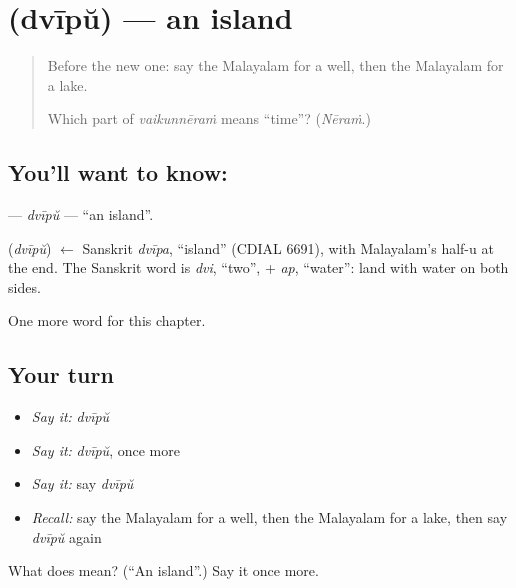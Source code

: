 \section[\texorpdfstring{\ml{ദ്വീപ്} (dvīpŭ)}{ദ്വീപ് (dvīpŭ)}]{ (dvīpŭ) — an island}

\label{lesson:ML-C148-dvipu}



\begin{quote}
Before the new one: say the Malayalam for a well, then the Malayalam for a lake.

Which part of \emph{vaikunnēraṁ} means \textquotedblleft{}time\textquotedblright{}? (\emph{Nēraṁ}.)
\end{quote}

\subsection*{You'll want to know: }
\textbf{} — \emph{dvīpŭ} — \textquotedblleft{}an island\textquotedblright{}.

\begin{cousinweb}
\textbf{} (\emph{dvīpŭ}) $\leftarrow$ Sanskrit \emph{dvīpa}, \textquotedblleft{}island\textquotedblright{} (CDIAL 6691), with Malayalam's half-u at the end. The Sanskrit word is \emph{dvi}, \textquotedblleft{}two\textquotedblright{}, + \emph{ap}, \textquotedblleft{}water\textquotedblright{}: land with water on both sides.
\end{cousinweb}

\begin{grammarlens}[title={What you've built}]
One more word for this chapter.
\end{grammarlens}

\subsection*{Your turn}
\begin{itemize}
\raggedright
  \item \emph{Say it:} \emph{dvīpŭ}
  \item \emph{Say it:} \emph{dvīpŭ}, once more
  \item \emph{Say it:} say \emph{dvīpŭ}
  \item \emph{Recall:} say the Malayalam for a well, then the Malayalam for a lake, then say \emph{dvīpŭ} again
\end{itemize}

\begin{tcolorbox}[breakable,colback=teal!4,colframe=teal!35!black,title={Before you move on}]
What does  mean? (\textquotedblleft{}An island\textquotedblright{}.) Say it once more.
\end{tcolorbox}
